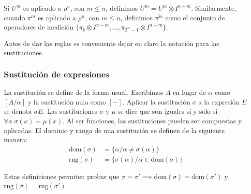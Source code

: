 Si $U^m$ es aplicado a $\rho^n$, con $m \leq n$, definimos $\overline{U ^m} = U^m \otimes I^{n-m}$. Similarmente, cuando $\pi^m$ es aplicado a $\rho^n$, con $m \leq n$, definimos $\overline{\pi^m}$ como el conjunto de operadores de medición $\{\pi_0\otimes I^{n-m}, \dots, \pi_{2^m-1} \otimes I^{n-m}\}$. 

Antes de dar las reglas es conveniente dejar en claro la notación para las sustituciones.


\subsubsection{Sustitución de expresiones}

La sustitución se define de la forma usual. Escribimos $A$ en lugar de $\alpha$ como $[A/\alpha]$ y la sustitución nula como $[-]$. Aplicar la sustitución $\sigma$ a la expresión $E$ se denota $\sigma E$.
Las sustituciones $\sigma$ y $\mu$ se dice que son iguales si y solo sí $\forall x\;\sigma(x)=\mu(x)$.
Al ser funciones, las sustituciones pueden ser compuestas y aplicadas. El dominio y rango de una sustitución se definen de la siguiente manera:
\begin{align}
    \text{dom}(\sigma) &= \{\alpha / \alpha \neq \sigma(\alpha)\} \\
    \text{rng}(\sigma) &= \{\sigma(\alpha) / \alpha \in \text{dom}(\sigma)\} 
\end{align}

Estas definiciones permiten probar que $\sigma=\sigma' \implies \text{dom}(\sigma) = \text{dom}(\sigma')$ y $\text{rng}(\sigma)=\text{rng}(\sigma')$.



